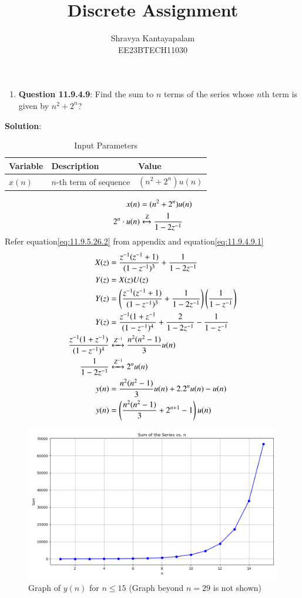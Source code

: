 \documentclass[a4,12pt,onecolumn]{IEEEtran}
\begin{document}
\title{Discrete Assignment}
\author{Shravya Kantayapalam\\ EE23BTECH11030}
\maketitle

\begin{enumerate}
    \item \textbf{Question 11.9.4.9}:
    Find the sum to $n$ terms of the series whose $n$th term is given by $n^2 + 2^n$?
 \end{enumerate}  
    \textbf{Solution}:
   

\begin{table}[htbp]
    \centering
    \caption{Input Parameters}
    \begin{tabular}{|l|l|l|}
    \hline
    \textbf{Variable} & \textbf{Description} & \textbf{Value} \\
    \hline
    \( x(n) \) & \( n \)-th term of sequence & \( (n^2 + 2^n)u(n) \) \\
    \hline
    \end{tabular}
\end{table}
\begin{align}
x(n)&=(n^2+2^n)u(n)\\
2^n \cdot u(n) &\xleftrightarrow{\text{Z}} \frac{1}{1 - 2z^{-1}} \label{eq:11.9.4.9.1}\\
\end{align}
Refer equation\eqref{eq:11.9.5.26.2} from appendix and equation\eqref{eq:11.9.4.9.1}
\begin{align}
X(z)&=\frac{z^{-1}(z^{-1} + 1)}{(1 - z^{-1})^3} +\frac{1}{1 - 2z^{-1}}\\
Y(z)&=X(z)U(z)\\
Y(z)&=\left(\frac{z^{-1}(z^{-1} + 1)}{(1 - z^{-1})^3} +\frac{1}{1 - 2z^{-1}}\right)\left(\frac{1}{1-z^{-1}}\right)\\
Y(z)&=\frac{z^{-1}(1+z^{-1}}{(1-z^{-1})^4}+\frac{2}{1-2z^{-1}}-\frac{1}{1-z^{-1}}\\
\frac{z^{-1}(1+z^{-1})}{(1-z^{-1})^4}&\xleftrightarrow{Z^{-1}} \frac{n^2(n^2-1)}{3}u(n)\\
\frac{1}{1-2z^{-1}}&\xleftrightarrow{Z^{-1}} 2^nu(n)\\
y(n)&=\frac{n^2(n^2-1)}{3}u(n)+2.2^nu(n)-u(n)\\
y(n)&=\left(\frac{n^2(n^2-1)}{3}+2^{n+1}-1\right)u(n)
\end{align}
\begin{figure}[ht]
    \centering
    \includegraphics[width=\columnwidth]{figs/main.png}
    \caption{Graph of $y(n)$ for $n \leq 15$ (Graph beyond $n = 29$ is not shown)}
    \label{fig:example}
\end{figure}
\end{document}

